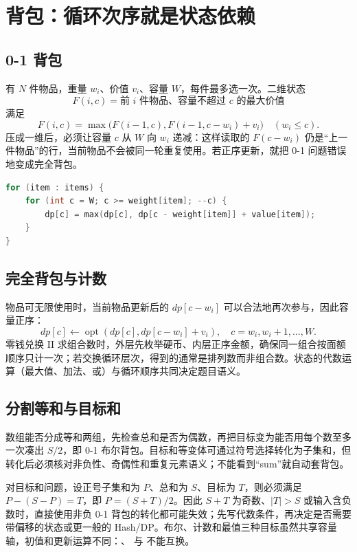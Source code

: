 \documentclass[UTF8,fontset=none,11pt,a4paper]{ctexart}
\begin{document}
\section{背包：循环次序就是状态依赖}

\subsection{0-1 背包}

有 $N$ 件物品，重量 $w_i$、价值 $v_i$、容量 $W$，每件最多选一次。二维状态
\[
F(i,c)=\text{前 }i\text{ 件物品、容量不超过 }c\text{ 的最大价值}
\]
满足
\[
F(i,c)=\max\bigl(F(i-1,c),F(i-1,c-w_i)+v_i\bigr)\quad (w_i\le c).
\]
压成一维后，必须让容量 $c$ 从 $W$ 向 $w_i$ 递减：这样读取的 $F(c-w_i)$ 仍是“上一件物品”的行，当前物品不会被同一轮重复使用。若正序更新，就把 0-1 问题错误地变成完全背包。

\begin{lstlisting}[language=C++,caption={0-1 背包的依赖方向}]
for (item : items) {
    for (int c = W; c >= weight[item]; --c) {
        dp[c] = max(dp[c], dp[c - weight[item]] + value[item]);
    }
}
\end{lstlisting}

\subsection{完全背包与计数}

物品可无限使用时，当前物品更新后的 $dp[c-w_i]$ 可以合法地再次参与，因此容量正序：
\[
dp[c]\leftarrow\operatorname{opt}(dp[c],dp[c-w_i]+v_i),\quad c=w_i,w_i+1,\ldots,W.
\]
零钱兑换 II 求组合数时，外层先枚举硬币、内层正序金额，确保同一组合按面额顺序只计一次；若交换循环层次，得到的通常是排列数而非组合数。状态的代数运算（最大值、加法、或）与循环顺序共同决定题目语义。

\subsection{分割等和与目标和}

数组能否分成等和两组，先检查总和是否为偶数，再把目标变为能否用每个数至多一次凑出 $S/2$，即 0-1 布尔背包。目标和等变体可通过符号选择转化为子集和，但转化后必须核对非负性、奇偶性和重复元素语义；不能看到“sum”就自动套背包。

对目标和问题，设正号子集和为 $P$、总和为 $S$、目标为 $T$，则必须满足 $P-(S-P)=T$，即 $P=(S+T)/2$。因此 $S+T$ 为奇数、$|T|>S$ 或输入含负数时，直接使用非负 0-1 背包的转化都可能失效；先写代数条件，再决定是否需要带偏移的状态或更一般的 Hash/DP。布尔、计数和最值三种目标虽然共享容量轴，初值和更新运算不同：、 与  不能互换。
\end{document}
